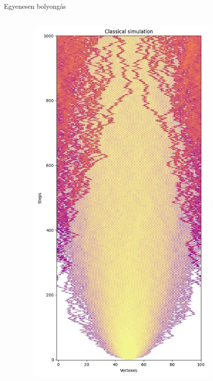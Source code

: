 \documentclass[aspectratio=169]{beamer}
\begin{document}
\begin{frame}{Egyenesen bolyongás}

  \begin{columns}[onlytextwidth]
    \begin{column}{.25\textwidth}
    \end{column}
    \begin{column}{.25\textwidth}
      \begin{figure}
        \includegraphics[width=0.9\textwidth]{./tdk_figures/results/path/classical.jpg}

\end{figure}
\end{column}
\end{columns}
\end{frame}
\end{document}
